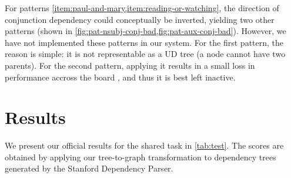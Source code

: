 \documentclass[11pt,a4paper]{article}
\begin{document}

For patterns \cref{item:paul-and-mary,item:reading-or-watching}, the
direction of conjunction dependency could conceptually be inverted, yielding two
other patterns (shown in
\cref{fig:pat-nsubj-conj-bad,fig:pat-aux-conj-bad}). However, we have
not implemented these patterns in our system. For the first pattern,
the reason is simple: it is not representable as a UD tree (a node
cannot have two parents). For the second pattern, applying it
results in a small loss in performance accross the board , and thus it is best left inactive.

\section{Results}
We present our official results for the shared task in
\cref{tab:test}. The scores are obtained by applying our tree-to-graph
transformation to dependency trees generated by the Stanford
Dependency Parser.
\end{document}
